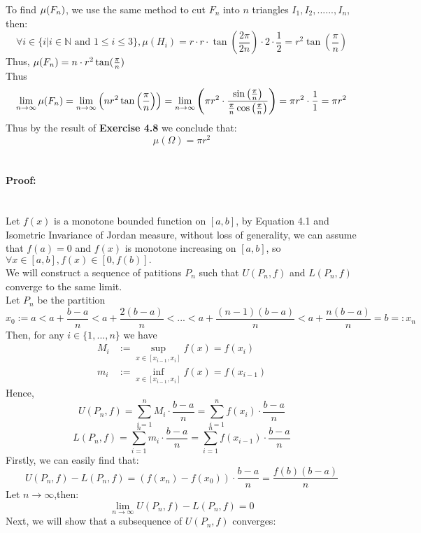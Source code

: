 \documentclass[11pt]{article}
\def\N{\mathbb{N}}
\def\W{\Omega}
\def\to{\rightarrow}
\begin{document}
To find $\mu(F_n)$, we use the same method to cut $F_n$ into $n$ triangles $I_1, I_2,......,I_n$, then:
$$\forall i\in \{i \big| i\in \N \text{ and } 1\le i\le 3\}, \mu(H_i)=r\cdot r\cdot \tan\left(\frac{2\pi}{2n}\right)\cdot2\cdot \frac{1}{2}=r^2\tan\left(\frac{\pi}{n}\right)$$
Thus, $\mu(F_n)=n\cdot r^2\tan (\frac{\pi}{n})$
\\Thus
$$\lim\limits_{n\to \infty} \muF= \lim\limits_{n\to \infty} \left( nr^2\tan \left(\frac{\pi}{n} \right)\right)=\lim\limits_{n\to\infty} \left(\pi r^2 \cdot \dfrac{\sin \left(\frac{\pi}{n}\right)}{\frac{\pi}{n}\cos\left(\frac{\pi}{n}\right)}\right)=\pi r^2\cdot \frac{1}{1}=\pi r^2$$
Thus by the result of \textbf{Exercise 4.8} we conclude that:
$$\mu(\W)=\pi r^2$$

\section{}
\paragraph{Proof:} \ \\
Let $f(x)$ is a monotone bounded function on $[a, b]$,
 by Equation 4.1 and Isometric Invariance of Jordan measure, without loss of generality, we can 
 assume that $f(a)=0$ and $f(x)$ is monotone increasing on $[a,b]$, so
 $\forall x\in [a,b],f(x)\in [0,f(b)].$\\
 We will construct a sequence of patitions $P_n$ such that
 $U(P_n,f)$ and $L(P_n,f)$ converge to the same limit.\\
 Let $P_n$ be the partition $$
 x_0:=a<a+\frac{b-a}{n}<a+\frac{2(b-a)}{n}<.
 ..<a+\frac{(n-1)(b-a)}{n}<a+\frac{n(b-a)}{n}=b=:x_n$$
Then, for any $i\in \{1,...,n\}$ we have
$$\begin{aligned}
M_i&:= \sup_{x\in [x_{i-1},x_i]} f(x)=f(x_i) \\
m_i&:= \inf_{x\in [x_{i-1},x_i]} f(x)=f(x_{i-1})
\end{aligned}$$
Hence,
$$
U(P_n,f)=\sum_{i=1}^{n}M_i\cdot \frac{b-a}{n}
=\sum_{i=1}^{n}f(x_i)\cdot\frac{b-a}{n}$$
$$
L(P_n,f)=\sum_{i=1}^{n}m_i\cdot \frac{b-a}{n}
=\sum_{i=1}^{n}f(x_{i-1})\cdot\frac{b-a}{n}$$
Firstly, we can easily find that:
$$U(P_n,f)-L(P_n,f)=(f(x_n)-f(x_0))\cdot\frac{b-a}{n}=\frac{f(b)(b-a)}{n}$$
Let $n\to\infty$,then:
$$\lim_{n\to\infty}U(P_n,f)-L(P_n,f)=0$$
Next, we will show that a subsequence of $U(P_n,f)$ converges:
\end{document}
